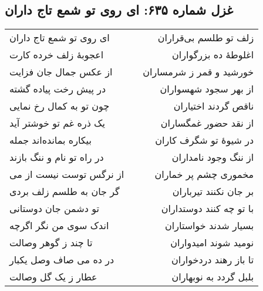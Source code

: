 \begin{center}
\section*{غزل شماره ۶۳۵: ای روی تو شمع تاج داران}
\label{sec:635}
\begin{longtable}{l p{0.5cm} r}
ای روی تو شمع تاج داران
&&
زلف تو طلسم بی‌قراران
\\
اعجوبهٔ زلف خرده کارت
&&
اغلوطهٔ ده بزرگواران
\\
از عکس جمال جان فزایت
&&
خورشید و قمر ز شرمساران
\\
در پیش رخت پیاده گشته
&&
از بهر سجود شهسواران
\\
چون تو به کمال رخ نمایی
&&
ناقص گردند اختیاران
\\
یک ذره غم تو خوشتر آید
&&
از نقد حضور غمگساران
\\
بیکاره بمانده‌اند جمله
&&
در شیوهٔ تو شگرف کاران
\\
در راه تو نام و ننگ بازند
&&
از ننگ وجود نامداران
\\
از نرگس توست نیست از می
&&
مخموری چشم پر خماران
\\
گر جان به طلسم زلف بردی
&&
بر جان نکنند تیرباران
\\
تو دشمن جان دوستانی
&&
با تو چه کنند دوستداران
\\
اندک سوی من نگر اگرچه
&&
بسیار شدند خواستاران
\\
تا چند ز گوهر وصالت
&&
نومید شوند امیدواران
\\
در ده می صاف وصل یکبار
&&
تا باز رهند دردخواران
\\
عطار ز یک گل وصالت
&&
بلبل گردد به نوبهاران
\\
\end{longtable}
\end{center}
